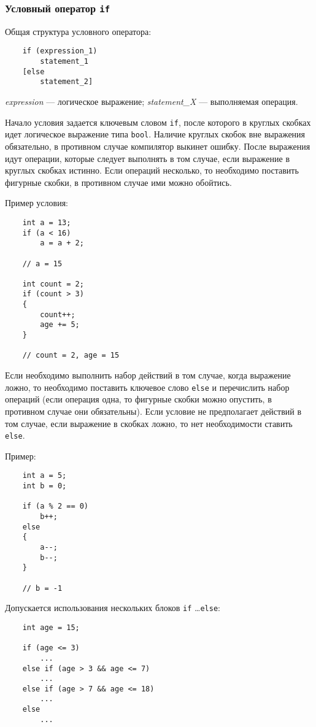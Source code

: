 \subsubsection{Условный оператор \texttt{if}}
Общая структура условного оператора:
\begin{lstlisting}
    if (expression_1)
        statement_1
    [else
        statement_2]
\end{lstlisting}

\textit{expression} --- логическое выражение; \textit{statement\_X} --- выполняемая операция.

Начало условия задается ключевым словом \lstinline|if|, после которого в круглых скобках идет логическое выражение типа \lstinline|bool|. Наличие круглых скобок вне выражения обязательно, в противном случае компилятор выкинет ошибку. После выражения идут операции, которые следует выполнять в том случае, если выражение в круглых скобках истинно. Если операций несколько, то необходимо поставить фигурные скобки, в противном случае ими можно обойтись.

Пример условия:

\begin{lstlisting}
    int a = 13;
    if (a < 16)
        a = a + 2;

    // a = 15

    int count = 2;
    if (count > 3)
    {
        count++;
        age += 5;
    }

    // count = 2, age = 15
\end{lstlisting}

Если необходимо выполнить набор действий в том случае, когда выражение ложно, то необходимо поставить ключевое слово \lstinline|else| и перечислить набор операций (если операция одна, то фигурные скобки можно опустить, в противном случае они обязательны). Если условие не предполагает действий в том случае, если выражение в скобках ложно, то нет необходимости ставить \lstinline|else|.

Пример:
\begin{lstlisting}
    int a = 5;
    int b = 0;

    if (a % 2 == 0)
        b++;
    else
    {
        a--;
        b--;
    }

    // b = -1
\end{lstlisting}

Допускается использования нескольких блоков \lstinline|if| \ldots \lstinline|else|:

\begin{lstlisting}
    int age = 15;

    if (age <= 3)
        ...
    else if (age > 3 && age <= 7)
        ...
    else if (age > 7 && age <= 18)
        ...
    else
        ...
\end{lstlisting}

